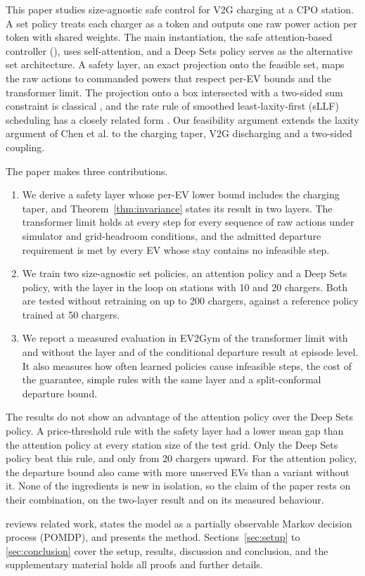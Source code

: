 This paper studies size-agnostic safe control for V2G charging at a CPO station.
A set policy treats each charger as a token and outputs one raw power action per token with shared weights.
The main instantiation, the safe attention-based controller (\method), uses self-attention, and a Deep Sets policy serves as the alternative set architecture.
A safety layer, an exact projection onto the feasible set, maps the raw actions to commanded powers that respect per-EV bounds and the transformer limit.
The projection onto a box intersected with a two-sided sum constraint is classical \cite{kiwiel2007breakpoint,wang2022efficient}, and the rate rule of smoothed least-laxity-first (sLLF) scheduling has a closely related form \cite{chen2022smoothed}.
Our feasibility argument extends the laxity argument of Chen et al. to the charging taper, V2G discharging and a two-sided coupling.

The paper makes three contributions.
\begin{enumerate}
\item We derive a safety layer whose per-EV lower bound includes the charging taper, and Theorem~\ref{thm:invariance} states its result in two layers. The transformer limit holds at every step for every sequence of raw actions under simulator and grid-headroom conditions, and the admitted departure requirement is met by every EV whose stay contains no infeasible step.
\item We train two size-agnostic set policies, an attention policy and a Deep Sets policy, with the layer in the loop on stations with 10 and 20 chargers. Both are tested without retraining on up to 200 chargers, against a reference policy trained at 50 chargers.
\item We report a measured evaluation in EV2Gym of the transformer limit with and without the layer and of the conditional departure result at episode level. It also measures how often learned policies cause infeasible steps, the cost of the guarantee, simple rules with the same layer and a split-conformal departure bound.
\end{enumerate}
The results do not show an advantage of the attention policy over the Deep Sets policy.
A price-threshold rule with the safety layer had a lower mean gap than the attention policy at every station size of the test grid.
Only the Deep Sets policy beat this rule, and only from 20 chargers upward.
For the attention policy, the departure bound also came with more unserved EVs than a variant without it.
None of the ingredients is new in isolation, so the claim of the paper rests on their combination, on the two-layer result and on its measured behaviour.

 reviews related work,  states the model as a partially observable Markov decision process (POMDP), and  presents the method.
Sections~\ref{sec:setup} to \ref{sec:conclusion} cover the setup, results, discussion and conclusion, and the supplementary material holds all proofs and further details.
